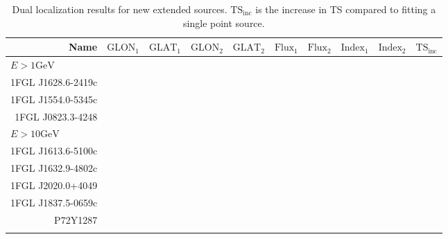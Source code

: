 \documentclass[preprint]{aastex}
\newcommand{\gev}{\text{GeV}\xspace}
\newcommand{\tsinc}{\ensuremath{\text{TS}_\text{inc}}\xspace}
\begin{document}
\clearpage
\begin{table}
    \begin{centering}
      \begin{tabular}{rrrrrrrrrr}
        Name               & $\text{GLON}_1$ & $\text{GLAT}_1$ & $\text{GLON}_2$ & $\text{GLAT}_2$ & $\text{Flux}_1$ & $\text{Flux}_2$ & $\text{Index}_1$ & $\text{Index}_2$ & \tsinc \\
        \hline
        \multicolumn{6}{l}{$E > 1\gev$} \\
        \hline
        1FGL J1628.6-2419c &&&&& \\
        1FGL J1554.0-5345c &&&&& \\
        1FGL J0823.3-4248  &&&&& \\
        \hline
        \multicolumn{6}{l}{$E > 10\gev$} \\
        \hline
        1FGL J1613.6-5100c &&&&& \\
        1FGL J1632.9-4802c &&&&& \\
        1FGL J2020.0+4049  &&&&& \\
        1FGL J1837.5-0659c &&&&& \\
        P72Y1287           &&&&& \\
        \hline
      \label{new_ext_srcs}
      \end{tabular}
      \caption{Dual localization results for new extended sources.
      \tsinc is the increase in TS compared to fitting a single point source. 
      }
    \end{centering}
\end{table}
\end{document}
